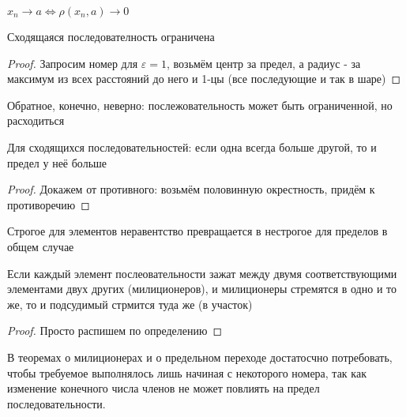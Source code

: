 \documentclass[12pt, a4paper]{article}
\begin{document}
  \begin{note}
  $x_n \to a \Leftrightarrow \rho(x_n, a) \to 0$
  \end{note}

  \begin{theorem}
  Сходящаяся последователность ограничена
  \end{theorem}
  \begin{proof}
  Запросим номер для $\varepsilon = 1$, возьмём центр за предел, 
  а радиус - за максимум из всех расстояний до него и 1-цы (все последующие и так в шаре)
  \end{proof}

  \begin{note}
  Обратное, конечно, неверно: послежовательность может быть ограниченной, но расходиться
  \end{note}


  \begin{theorem}
  Для сходящихся последовательностей: если одна всегда больше другой, то и предел у неё больше
  \end{theorem}
  \begin{proof}
  Докажем от противного: возьмём половинную окрестность, придём к противоречию
  \end{proof}

  \begin{note}
  Строгое для элементов неравентство превращается в нестрогое для пределов в общем случае
  \end{note}

  \begin{definition}
  \end{definition}



  \begin{theorem}
  Если каждый элемент послеовательности зажат между двумя соответствующими элементами двух других (милиционеров), 
  и милиционеры стремятся в одно и то же, то и подсудимый стрмится туда же (в участок)
  \end{theorem}
  \begin{proof}
  Просто распишем по определению
  \end{proof}


  \begin{note}
  В теоремах о милиционерах и о предельном переходе достатосчно потребовать,
  чтобы требуемое выполнялось лишь начиная с некоторого номера, так как 
  изменение конечного числа членов не может повлиять на предел последовательности.
  \end{note}
\end{document}
